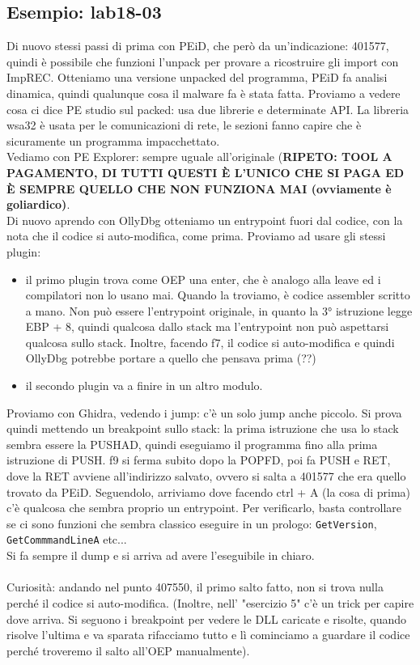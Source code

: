 \documentclass[12pt, oneside]{extbook}
\begin{document}
\subsection{Esempio: lab18-03}
Di nuovo stessi passi di prima con PEiD, che però da un'indicazione: 401577, quindi è possibile che funzioni l'unpack per provare a ricostruire gli import con ImpREC. Otteniamo una versione unpacked del programma, PEiD fa analisi dinamica, quindi qualunque cosa il malware fa è stata fatta. Proviamo a vedere cosa ci dice PE studio sul packed: usa due librerie e determinate API. La libreria wsa32 è usata per le comunicazioni di rete, le sezioni fanno capire che è sicuramente un programma impacchettato.\\Vediamo con PE Explorer: sempre uguale all'originale (\textbf{\textsf{RIPETO: TOOL A PAGAMENTO, DI TUTTI QUESTI È L'UNICO CHE SI PAGA ED È SEMPRE QUELLO CHE NON FUNZIONA MAI (ovviamente è goliardico)}}.\\Di nuovo aprendo con OllyDbg otteniamo un entrypoint fuori dal codice, con la nota che il codice si auto-modifica, come prima. Proviamo ad usare gli stessi plugin:
\begin{itemize}
\item il primo plugin trova come OEP una enter, che è analogo alla leave ed i compilatori non lo usano mai. Quando la troviamo, è codice assembler scritto a mano. Non può essere l'entrypoint originale, in quanto la 3° istruzione legge EBP + 8, quindi qualcosa dallo stack ma l'entrypoint non può aspettarsi qualcosa sullo stack. Inoltre, facendo f7, il codice si auto-modifica e quindi OllyDbg potrebbe portare a quello che pensava prima (??)
\item il secondo plugin va a finire in un altro modulo.
\end{itemize}
Proviamo con Ghidra, vedendo i jump: c'è un solo jump anche piccolo. Si prova quindi mettendo un breakpoint sullo stack: la prima istruzione che usa lo stack sembra essere la PUSHAD, quindi eseguiamo il programma fino alla prima istruzione di PUSH. f9 si ferma subito dopo la POPFD, poi fa PUSH e RET, dove la RET avviene all'indirizzo salvato, ovvero si salta a 401577 che era quello trovato da PEiD. Seguendolo, arriviamo dove facendo ctrl + A (la cosa di prima) c'è qualcosa che sembra proprio un entrypoint. Per verificarlo, basta controllare se ci sono funzioni che sembra classico eseguire in un prologo: \texttt{GetVersion}, \texttt{GetCommmandLineA} etc...\\Si fa sempre il dump e si arriva ad avere l'eseguibile in chiaro.\\\\Curiosità: andando nel punto 407550, il primo salto fatto, non si trova nulla perché il codice si auto-modifica. (Inoltre, nell' "esercizio 5" c'è un trick per capire dove arriva. Si seguono i breakpoint per vedere le DLL caricate e risolte, quando risolve l'ultima e va sparata rifacciamo tutto e lì cominciamo a guardare il codice perché troveremo il salto all'OEP manualmente).
\end{document}
